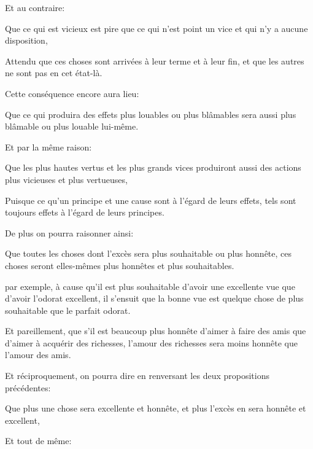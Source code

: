 Et au contraire:

\begin{lieu}
	Que ce qui est vicieux est pire que ce qui n'est point un vice et qui n'y a aucune disposition,
\end{lieu}

Attendu que ces choses sont arrivées à leur terme et à leur fin, et que les autres ne sont pas en cet état-là.

\bigbreak

Cette conséquence encore aura lieu:

\begin{lieu}
	Que ce qui produira des effets plus louables ou plus blâmables sera aussi plus blâmable ou plus louable
	lui-même.
\end{lieu}

Et par la même raison:

\begin{lieu}
	Que les plus hautes vertus et les plus grands vices produiront aussi des actions plus vicieuses et plus
	vertueuses,
\end{lieu}

Puisque ce qu'un principe et une cause sont à l’égard de leurs effets, tels sont toujours effets à l'égard de
leurs principes.

\bigbreak

De plus on pourra raisonner ainsi:

\begin{lieu}
	Que toutes les choses dont l'excès sera plus souhaitable ou plus honnête, ces choses seront elles-mêmes
	plus honnêtes et plus souhaitables.
\end{lieu}

par exemple, à cause qu'il est plus souhaitable d'avoir une excellente vue que d'avoir l'odorat excellent, il
s'ensuit que la bonne vue est quelque chose de plus souhaitable que le parfait odorat.

Et pareillement, que s'il est beaucoup plus honnête d'aimer à faire des amis que d'aimer à acquérir des richesses,
l'amour des richesses sera moins honnête que l'amour des amis.

Et réciproquement, on pourra dire en renversant les deux propositions précédentes:

\begin{lieu}
	Que plus une chose sera excellente et honnête, et plus l'excès en sera honnête et excellent,
\end{lieu}

Et tout de même:

